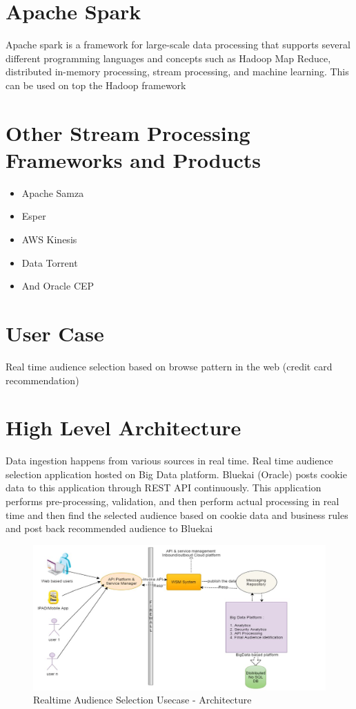 \section{Apache Spark}

Apache spark is a framework for large-scale data processing that
supports several different programming languages and concepts such as
Hadoop Map Reduce, distributed in-memory processing, stream
processing, and machine learning. This can be used on top the Hadoop
framework

\section{Other Stream Processing Frameworks and Products}

\begin{itemize}
\item Apache Samza
\item Esper 
\item AWS Kinesis 
\item Data Torrent 
\item And Oracle CEP 
\end{itemize}


\section{User Case}

Real time audience selection based on browse pattern in the web
(credit card recommendation)

\section{High Level Architecture}

Data ingestion happens from various sources in real time. Real time
audience selection application hosted on Big Data platform.  Bluekai
(Oracle) posts cookie data to this application through REST API
continuously. This application performs pre-processing, validation,
and then perform actual processing in real time and then find the
selected audience based on cookie data and business rules and post
back recommended audience to Bluekai

\begin{figure}[!ht]
\centering\includegraphics[width=\columnwidth]{images/realTimeAudienceSelection.JPG}
  \caption{Realtime Audience Selection Usecase - Architecture}\label{f:hdfs-realtime}
\end{figure}

